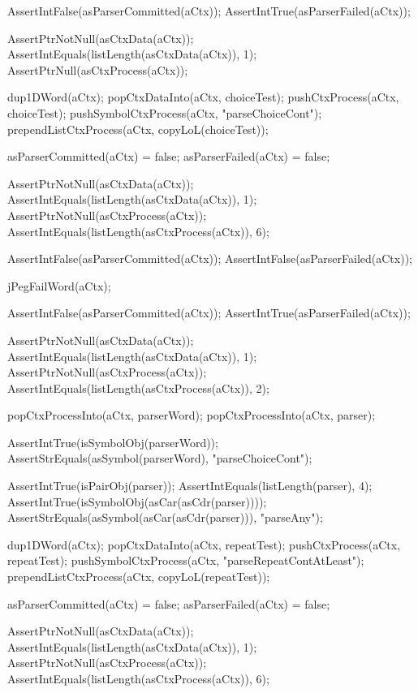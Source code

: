   AssertIntFalse(asParserCommitted(aCtx));
  AssertIntTrue(asParserFailed(aCtx));
  
  AssertPtrNotNull(asCtxData(aCtx));
  AssertIntEquals(listLength(asCtxData(aCtx)), 1);
  AssertPtrNull(asCtxProcess(aCtx));
\stopCTest
\stopTestCase

\startCTest  
  dup1DWord(aCtx);
  popCtxDataInto(aCtx, choiceTest);
  pushCtxProcess(aCtx, choiceTest);
  pushSymbolCtxProcess(aCtx, "parseChoiceCont");
  prependListCtxProcess(aCtx, copyLoL(choiceTest));
  
  asParserCommitted(aCtx) = false;
  asParserFailed(aCtx)    = false;
  
  AssertPtrNotNull(asCtxData(aCtx));
  AssertIntEquals(listLength(asCtxData(aCtx)), 1);
  AssertPtrNotNull(asCtxProcess(aCtx));
  AssertIntEquals(listLength(asCtxProcess(aCtx)), 6);
  
  AssertIntFalse(asParserCommitted(aCtx));
  AssertIntFalse(asParserFailed(aCtx));
  
  jPegFailWord(aCtx);
  
  AssertIntFalse(asParserCommitted(aCtx));
  AssertIntTrue(asParserFailed(aCtx));
  
  AssertPtrNotNull(asCtxData(aCtx));
  AssertIntEquals(listLength(asCtxData(aCtx)), 1);
  AssertPtrNotNull(asCtxProcess(aCtx));
  AssertIntEquals(listLength(asCtxProcess(aCtx)), 2);
  
  popCtxProcessInto(aCtx, parserWord);
  popCtxProcessInto(aCtx, parser);
  
  AssertIntTrue(isSymbolObj(parserWord));
  AssertStrEquals(asSymbol(parserWord), "parseChoiceCont");
  
  AssertIntTrue(isPairObj(parser));
  AssertIntEquals(listLength(parser), 4);
  AssertIntTrue(isSymbolObj(asCar(asCdr(parser))));
  AssertStrEquals(asSymbol(asCar(asCdr(parser))), "parseAny");
\stopCTest
\stopTestCase

\startCTest
  dup1DWord(aCtx);
  popCtxDataInto(aCtx, repeatTest);
  pushCtxProcess(aCtx, repeatTest);
  pushSymbolCtxProcess(aCtx, "parseRepeatContAtLeast");
  prependListCtxProcess(aCtx, copyLoL(repeatTest));
  
  asParserCommitted(aCtx) = false;
  asParserFailed(aCtx)    = false;
  
  AssertPtrNotNull(asCtxData(aCtx));
  AssertIntEquals(listLength(asCtxData(aCtx)), 1);
  AssertPtrNotNull(asCtxProcess(aCtx));
  AssertIntEquals(listLength(asCtxProcess(aCtx)), 6);
  
